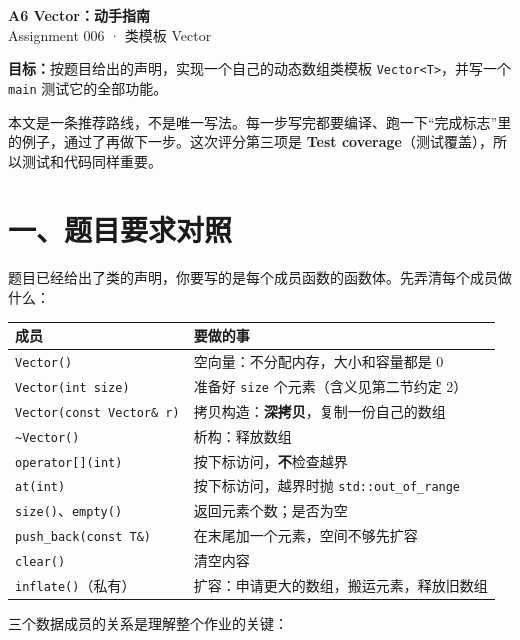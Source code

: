 \documentclass[11pt,a4paper]{article}
\newcommand{\code}[1]{\texttt{#1}}
\begin{document}
\sloppy
\setlength{\emergencystretch}{3em}

\begin{center}
  {\LARGE\bfseries A6 Vector：动手指南}\\[0.8ex]
  {\normalsize Assignment 006 · 类模板 Vector}
\end{center}

\textbf{目标：}按题目给出的声明，实现一个自己的动态数组类模板 \code{Vector<T>}，并写一个 \code{main} 测试它的全部功能。

本文是一条推荐路线，不是唯一写法。每一步写完都要编译、跑一下“完成标志”里的例子，通过了再做下一步。这次评分第三项是 \textbf{Test coverage}（测试覆盖），所以测试和代码同样重要。

\section{一、题目要求对照}

题目已经给出了类的声明，你要写的是每个成员函数的函数体。先弄清每个成员做什么：

\begin{center}
\small
\begin{tabularx}{\linewidth}{@{}>{\raggedright\arraybackslash}p{4.4cm}>{\raggedright\arraybackslash}X@{}}
\toprule
成员 & 要做的事 \\
\midrule
\code{Vector()} & 空向量：不分配内存，大小和容量都是 0 \\
\code{Vector(int size)} & 准备好 \code{size} 个元素（含义见第二节约定 2） \\
\code{Vector(const Vector\& r)} & 拷贝构造：\textbf{深拷贝}，复制一份自己的数组 \\
\code{\textasciitilde Vector()} & 析构：释放数组 \\
\code{operator[](int)} & 按下标访问，\textbf{不}检查越界 \\
\code{at(int)} & 按下标访问，越界时抛 \code{std::out\_of\_range} \\
\code{size()}、\code{empty()} & 返回元素个数；是否为空 \\
\code{push\_back(const T\&)} & 在末尾加一个元素，空间不够先扩容 \\
\code{clear()} & 清空内容 \\
\code{inflate()}（私有） & 扩容：申请更大的数组，搬运元素，释放旧数组 \\
\bottomrule
\end{tabularx}
\end{center}

三个数据成员的关系是理解整个作业的关键：
\end{document}
